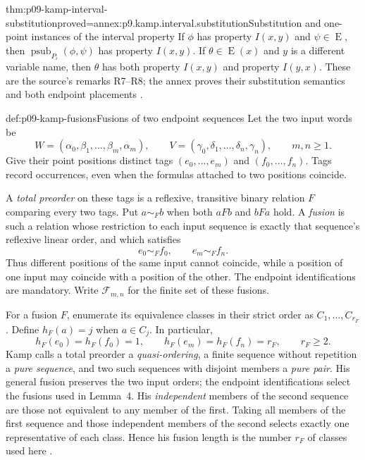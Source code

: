\begin{hblemma}{thm:p09-kamp-interval-substitution}{proved=annex:p9.kamp.interval.substitution}{Substitution and one-point instances of the interval property}
If \(\phi\) has property \(I(x,y)\) and
\(\psi\in\operatorname{E}\), then
\(\operatorname{psub}_{P_i}(\phi,\psi)\) has property \(I(x,y)\).
If \(\theta\in\operatorname{E}(x)\) and \(y\) is a different
variable name, then \(\theta\) has both property \(I(x,y)\) and
property \(I(y,x)\). These are the source's remarks R7--R8; the annex
proves their substitution semantics and both endpoint placements
\cite[ch.~III, p.~68]{Kamp1968}.
\end{hblemma}

\begin{hbdefinition}{def:p09-kamp-fusions}{Fusions of two endpoint sequences}
Let the two input words be
\[
 W=(\alpha_0,\beta_1,\ldots,\beta_m,\alpha_m),\qquad
 V=(\gamma_0,\delta_1,\ldots,\delta_n,\gamma_n),
 \qquad m,n\geq1.
\]
Give their point positions distinct tags
\((e_0,\ldots,e_m)\) and \((f_0,\ldots,f_n)\). Tags record
occurrences, even when the formulas attached to two positions coincide.

A \emph{total preorder} on these tags is a reflexive, transitive binary
relation \(F\) comparing every two tags. Put
\(a\sim_F b\) when both \(aFb\) and \(bFa\) hold. A
\emph{fusion} is such a relation whose restriction to each input sequence
is exactly that sequence's reflexive linear order, and which satisfies
\[
                      e_0\sim_F f_0,
                \qquad e_m\sim_F f_n.
\]
Thus different positions of the same input cannot coincide, while a
position of one input may coincide with a position of the other. The
endpoint identifications are mandatory. Write \(\mathcal F_{m,n}\)
for the finite set of these fusions.

For a fusion \(F\), enumerate its equivalence classes in their strict
order as \(C_1,\ldots,C_{r_F}\). Define \(h_F(a)=j\) when
\(a\in C_j\). In particular,
\[
 h_F(e_0)=h_F(f_0)=1,\qquad
 h_F(e_m)=h_F(f_n)=r_F,\qquad r_F\geq2.
\]
Kamp calls a total preorder a \emph{quasi-ordering}, a finite sequence
without repetition a \emph{pure sequence}, and two such sequences with
disjoint members a \emph{pure pair}. His general fusion preserves the
two input orders; the endpoint identifications select the fusions used
in Lemma~4. His \emph{independent} members of the second
sequence are those not equivalent to any member of the first. Taking all
members of the first sequence and those independent members of the second
selects exactly one representative of each class. Hence his fusion length
is the number \(r_F\) of classes used here
\cite[ch.~III, pp.~74--75]{Kamp1968}.
\end{hbdefinition}

